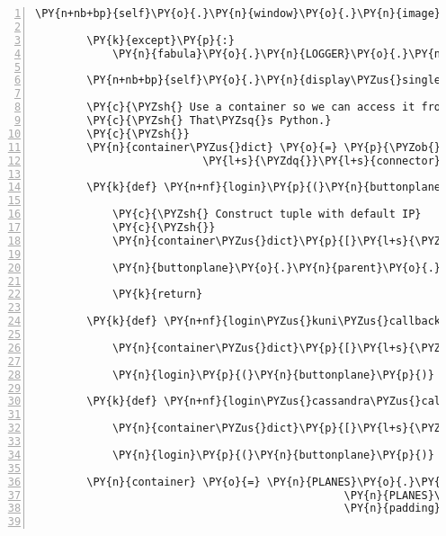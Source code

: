 \begin{Verbatim}[commandchars=\\\{\},numbers=left,firstnumber=1,stepnumber=1]
            \PY{n+nb+bp}{self}\PY{o}{.}\PY{n}{window}\PY{o}{.}\PY{n}{image} \PY{o}{=} \PY{n}{surface}

        \PY{k}{except}\PY{p}{:}
            \PY{n}{fabula}\PY{o}{.}\PY{n}{LOGGER}\PY{o}{.}\PY{n}{warning}\PY{p}{(}\PY{l+s}{\PYZdq{}}\PY{l+s}{splash.png not found, not displaying splash screen}\PY{l+s}{\PYZdq{}}\PY{p}{)}

        \PY{n+nb+bp}{self}\PY{o}{.}\PY{n}{display\PYZus{}single\PYZus{}frame}\PY{p}{(}\PY{p}{)}

        \PY{c}{\PYZsh{} Use a container so we can access it from an ad\PYZhy{}hoc function.}
        \PY{c}{\PYZsh{} That\PYZsq{}s Python.}
        \PY{c}{\PYZsh{}}
        \PY{n}{container\PYZus{}dict} \PY{o}{=} \PY{p}{\PYZob{}}\PY{l+s}{\PYZdq{}}\PY{l+s}{login\PYZus{}name}\PY{l+s}{\PYZdq{}} \PY{p}{:} \PY{n+nb+bp}{None}\PY{p}{,}
                          \PY{l+s}{\PYZdq{}}\PY{l+s}{connector}\PY{l+s}{\PYZdq{}} \PY{p}{:} \PY{n+nb+bp}{None}\PY{p}{\PYZcb{}}

        \PY{k}{def} \PY{n+nf}{login}\PY{p}{(}\PY{n}{buttonplane}\PY{p}{)}\PY{p}{:}

            \PY{c}{\PYZsh{} Construct tuple with default IP}
            \PY{c}{\PYZsh{}}
            \PY{n}{container\PYZus{}dict}\PY{p}{[}\PY{l+s}{\PYZdq{}}\PY{l+s}{connector}\PY{l+s}{\PYZdq{}}\PY{p}{]} \PY{o}{=} \PY{l+s}{\PYZdq{}}\PY{l+s}{127.0.0.1}\PY{l+s}{\PYZdq{}}

            \PY{n}{buttonplane}\PY{o}{.}\PY{n}{parent}\PY{o}{.}\PY{n}{destroy}\PY{p}{(}\PY{p}{)}

            \PY{k}{return}

        \PY{k}{def} \PY{n+nf}{login\PYZus{}kuni\PYZus{}callback}\PY{p}{(}\PY{n}{buttonplane}\PY{p}{)}\PY{p}{:}

            \PY{n}{container\PYZus{}dict}\PY{p}{[}\PY{l+s}{\PYZdq{}}\PY{l+s}{login\PYZus{}name}\PY{l+s}{\PYZdq{}}\PY{p}{]} \PY{o}{=} \PY{n}{ID\PYZus{}KUNI}

            \PY{n}{login}\PY{p}{(}\PY{n}{buttonplane}\PY{p}{)}

        \PY{k}{def} \PY{n+nf}{login\PYZus{}cassandra\PYZus{}callback}\PY{p}{(}\PY{n}{buttonplane}\PY{p}{)}\PY{p}{:}

            \PY{n}{container\PYZus{}dict}\PY{p}{[}\PY{l+s}{\PYZdq{}}\PY{l+s}{login\PYZus{}name}\PY{l+s}{\PYZdq{}}\PY{p}{]} \PY{o}{=} \PY{n}{ID\PYZus{}CASSANDRA}

            \PY{n}{login}\PY{p}{(}\PY{n}{buttonplane}\PY{p}{)}

        \PY{n}{container} \PY{o}{=} \PY{n}{PLANES}\PY{o}{.}\PY{n}{gui}\PY{o}{.}\PY{n}{tmb}\PY{o}{.}\PY{n}{TMBContainer}\PY{p}{(}\PY{l+s}{\PYZdq{}}\PY{l+s}{get\PYZus{}connection\PYZus{}details}\PY{l+s}{\PYZdq{}}\PY{p}{,}
                                                \PY{n}{PLANES}\PY{o}{.}\PY{n}{gui}\PY{o}{.}\PY{n}{tmb}\PY{o}{.}\PY{n}{C\PYZus{}256\PYZus{}STYLE}\PY{p}{,}
                                                \PY{n}{padding}\PY{o}{=}\PY{l+m+mi}{5}\PY{p}{)}


\end{Verbatim}
